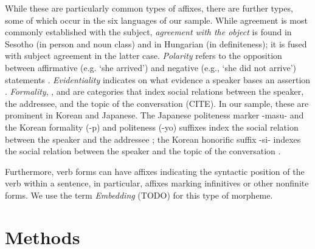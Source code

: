 \documentclass[11pt,letterpaper]{article}
\begin{document}
While these are particularly common types of affixes, there are further types, some of which occur in the six languages of our sample.
While agreement is most commonly established with the subject, \textit{agreement with the object} is found in Sesotho \citep{doke1967textbook} (in person and noun class) and in Hungarian \citep{rounds2001hungarian} (in definiteness); it is fused with subject agreement in the latter case.
\textit{Polarity} refers to the opposition between affirmative (e.g. `she arrived') and negative  (e.g., `she did not arrive') statements \citep{wals-112}.
\textit{Evidentiality} indicates on what evidence a speaker bases an assertion \citep{aikhenvald2003evidentiality}.
\textit{Formality}, , and  are categories that index social relations between the speaker, the addressee, and the topic of the conversation (CITE).
In our sample, these are prominent in Korean and Japanese.
The Japanese politeness marker -masu- and the Korean formality (-p) and politeness (-yo) suffixes index the social relation between the speaker and the addressee \citep{hasegawa2014japanese, yeon2010korean}; the Korean honorific suffix -si- indexes the social relation between the speaker and the topic of the conversation \citep{yeon2010korean}.

Furthermore, verb forms can have affixes indicating the syntactic position of the verb within a sentence, in particular, affixes marking infinitives or other nonfinite forms.
We use the term \textit{Embedding} (TODO) for this type of morpheme.








\section{Methods}
\end{document}
